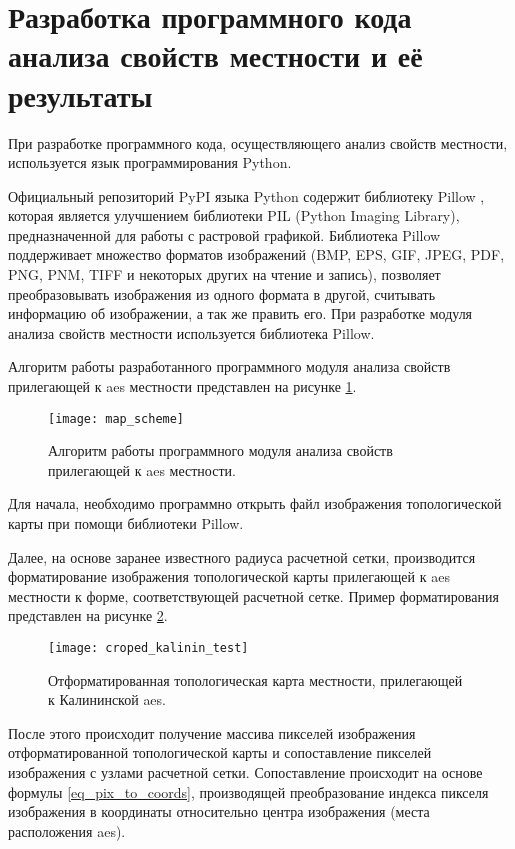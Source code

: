 \section{Разработка программного кода анализа свойств местности и её результаты}

При разработке программного кода, осуществляющего анализ свойств местности, используется язык программирования Python. 

Официальный репозиторий PyPI языка Python содержит библиотеку Pillow \cite{pillow}, которая является улучшением 
библиотеки PIL (Python Imaging Library), предназначенной для работы с растровой графикой. Библиотека Pillow 
поддерживает множество форматов изображений (BMP, EPS, GIF, JPEG, PDF, PNG, PNM, TIFF и некоторых других на чтение и 
запись), позволяет преобразовывать изображения из одного формата в другой, считывать информацию об изображении, а так 
же править его. При разработке модуля анализа свойств местности используется библиотека Pillow.

Алгоритм работы разработанного программного модуля анализа свойств прилегающей к \ac{aes} местности представлен на 
рисунке \ref{fig_alg_map_scheme}.

\begin{figure}[ht]
\centering
    \texttt{[image: map\_scheme]}
    \captionsetup{justification=centering}
    \caption{Алгоритм работы программного модуля анализа свойств прилегающей к \ac{aes} местности.}
    \label{fig_alg_map_scheme}
\end{figure}

Для начала, необходимо программно открыть файл изображения топологической карты при помощи библиотеки Pillow.

Далее, на основе заранее известного радиуса расчетной сетки, производится форматирование изображения топологической 
карты прилегающей к \ac{aes} местности к форме, соответствующей расчетной сетке. Пример форматирования представлен на 
рисунке \ref{fig_cropped_map_scheme}.

\begin{figure}[ht]
\centering
    \texttt{[image: croped\_kalinin\_test]}
    \captionsetup{justification=centering}
    \caption{Отформатированная топологическая карта местности, прилегающей к Калининской \ac{aes}.}
    \label{fig_cropped_map_scheme}
\end{figure}

После этого происходит получение массива пикселей изображения отформатированной топологической карты и сопоставление 
пикселей изображения с узлами расчетной сетки. Сопоставление происходит на основе формулы \ref{eq_pix_to_coords}, 
производящей преобразование индекса пикселя изображения в координаты относительно центра изображения (места расположения 
\ac{aes}).

